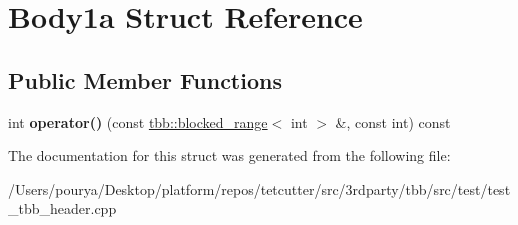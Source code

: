 \hypertarget{structBody1a}{}\section{Body1a Struct Reference}
\label{structBody1a}
\subsection*{Public Member Functions}
\begin{DoxyCompactItemize}
\item 
\hypertarget{structBody1a_a5c1b77a35cdd2a0446a750d2d8a8a914}{}int {\bfseries operator()} (const \hyperlink{classtbb_1_1blocked__range}{tbb\+::blocked\+\_\+range}$<$ int $>$ \&, const int) const \label{structBody1a_a5c1b77a35cdd2a0446a750d2d8a8a914}

\end{DoxyCompactItemize}


The documentation for this struct was generated from the following file\+:\begin{DoxyCompactItemize}
\item 
/\+Users/pourya/\+Desktop/platform/repos/tetcutter/src/3rdparty/tbb/src/test/test\+\_\+tbb\+\_\+header.\+cpp\end{DoxyCompactItemize}
